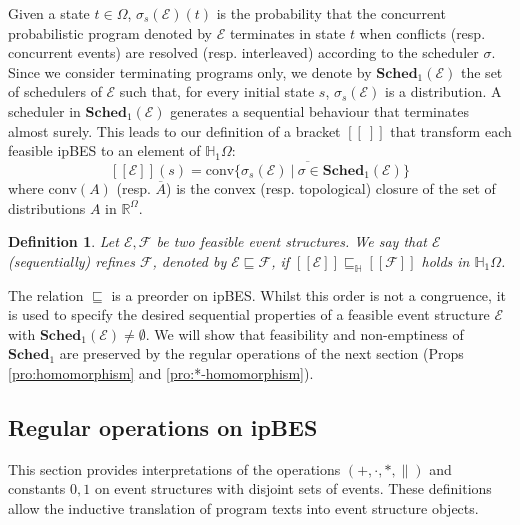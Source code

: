 \documentclass[review]{elsart}
\newtheorem{definition}{Definition}[section]
\newcommand{\Real}{{\mathbb R}}
\renewcommand{\H}{\mathbb{H}}
\newcommand{\conv}{\mathrm{conv}}
\newcommand{\EE}{\mathcal{E}}
\newcommand{\FF}{\mathcal{F}}
\newcommand{\sched}{\mathbf{Sched}}
\newcommand{\sem}[1]{[\![#1]\!]}
\newcommand{\bks}{*}
\newcommand{\refby}{\sqsubseteq}
\newcommand{\refbyh}{\sqsubseteq_{\mathbb{H}}}
\begin{document}
Given a state $t{\in}\Omega$, $\sigma_s(\EE)(t)$ is the probability that the concurrent probabilistic program denoted by $\EE$ terminates in state $t$ when conflicts (resp. concurrent events) are resolved (resp. interleaved) according to the scheduler $\sigma$. Since we consider terminating programs only, we denote by $\sched_1(\EE)$ the set of schedulers of $\EE$ such that, for every initial state $s$, $\sigma_s(\EE)$ is a distribution. A scheduler in $\sched_1(\EE)$  generates a sequential behaviour that terminates almost surely. This leads to our definition of a bracket $\sem{\ }$ that transform each feasible ipBES to an element of $\H_1\Omega$: \[
	\sem{\EE}(s) = \overline{\conv\{\sigma_s(\EE)\ |\ \sigma{\in}\sched_1(\EE)\}}
\]
where $\conv(A)$ (resp. $\overline{A}$) is the convex (resp. topological) closure of the set of distributions $A$ in $\Real^\Omega$. 

\begin{definition}\label{def:semantics-sequential}
Let $\EE,\FF$ be two feasible event structures. We say that $\EE$ (sequentially) refines $\FF$, denoted by $\EE\refby\FF$, if $\sem{\EE}\refbyh\sem{\FF}$ holds in $\H_1\Omega$.
\end{definition}

The relation $\refby$ is a preorder on ipBES. Whilst this order is not a congruence, it is used to specify the desired sequential properties of a feasible event structure $\EE$ with $\sched_1(\EE){\neq}\emptyset$. We will show that feasibility and non-emptiness of $\sched_1$ are preserved by the regular operations of the next section (Props \ref{pro:homomorphism} and \ref{pro:*-homomorphism}).

\subsection{Regular operations on ipBES}\label{S:seqred}

This section provides interpretations of the operations $(+,\cdot,\bks,\|)$ and constants $0,1$ on event structures with disjoint sets of events. These definitions allow the inductive translation of program texts into event structure objects.
\end{document}
